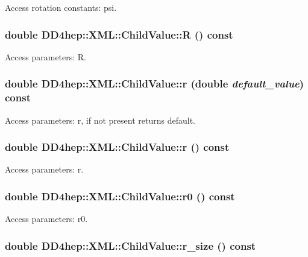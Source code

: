 Access rotation constants: psi. \hypertarget{struct_d_d4hep_1_1_x_m_l_1_1_child_value_a129d3a6eb37511d23b64ea58a3dedd2a}{
\subsubsection[{R}]{\setlength{\rightskip}{0pt plus 5cm}double DD4hep::XML::ChildValue::R () const}}
\label{struct_d_d4hep_1_1_x_m_l_1_1_child_value_a129d3a6eb37511d23b64ea58a3dedd2a}


Access parameters: R. \hypertarget{struct_d_d4hep_1_1_x_m_l_1_1_child_value_a205312befd2bb91090093b7fc16cdd44}{
\subsubsection[{r}]{\setlength{\rightskip}{0pt plus 5cm}double DD4hep::XML::ChildValue::r (double {\em default\_\-value}) const}}
\label{struct_d_d4hep_1_1_x_m_l_1_1_child_value_a205312befd2bb91090093b7fc16cdd44}


Access parameters: r, if not present returns default. \hypertarget{struct_d_d4hep_1_1_x_m_l_1_1_child_value_a9b689b155cc4f4e35970bbc652bf33ec}{
\subsubsection[{r}]{\setlength{\rightskip}{0pt plus 5cm}double DD4hep::XML::ChildValue::r () const}}
\label{struct_d_d4hep_1_1_x_m_l_1_1_child_value_a9b689b155cc4f4e35970bbc652bf33ec}


Access parameters: r. \hypertarget{struct_d_d4hep_1_1_x_m_l_1_1_child_value_a0f810f64e3c5e67f3fbef0549ac550b7}{
\subsubsection[{r0}]{\setlength{\rightskip}{0pt plus 5cm}double DD4hep::XML::ChildValue::r0 () const}}
\label{struct_d_d4hep_1_1_x_m_l_1_1_child_value_a0f810f64e3c5e67f3fbef0549ac550b7}


Access parameters: r0. \hypertarget{struct_d_d4hep_1_1_x_m_l_1_1_child_value_a37ebca44cc92eb011023abdeab5cc72b}{
\subsubsection[{r\_\-size}]{\setlength{\rightskip}{0pt plus 5cm}double DD4hep::XML::ChildValue::r\_\-size () const}}
\label{struct_d_d4hep_1_1_x_m_l_1_1_child_value_a37ebca44cc92eb011023abdeab5cc72b}


